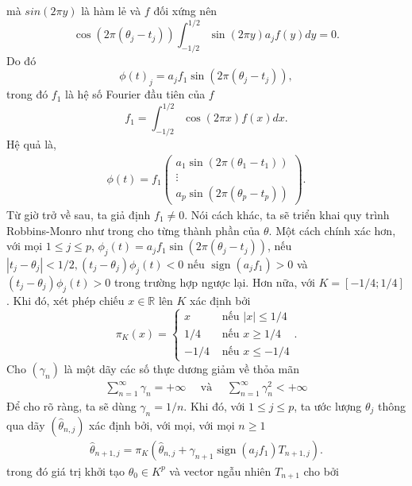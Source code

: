 mà $sin(2\pi y)$ là hàm lẻ và $f$ đối xứng nên
$$
\cos (2 \pi(\theta_j-t_{j})) \int_{-1 / 2}^{1 / 2} \sin (2 \pi y) a_{j}f(y) d y = 0.
$$
Do đó
$$
\phi(t)_j =a_{j} f_{1} \sin \left(2 \pi\left(\theta_{j}-t_{j}\right)\right),
$$
trong đó $f_{1}$ là hệ số Fourier đầu tiên của $f$
$$
f_{1}=\int_{-1 / 2}^{1 / 2} \cos (2 \pi x) f(x) d x.
$$
Hệ quả là,
\begin{align}
    \phi(t)=f_{1}\left(\begin{array}{c}
a_{1} \sin \left(2 \pi\left(\theta_{1}-t_{1}\right)\right) \\
\vdots \\
a_{p} \sin \left(2 \pi\left(\theta_{p}-t_{p}\right)\right)
\end{array}\right).
\label{4.4}
\end{align}
Từ giờ trở về sau, ta giả định $f_{1} \neq 0$. Nói cách khác, ta sẽ triển khai quy trình Robbins-Monro như trong \cite{bercu} cho từng thành phần của  $\theta$. Một cách chính xác hơn, với mọi $1 \leq j \leq p$,  $\phi_{j}(t)=a_{j} f_{1} \sin \left(2 \pi\left(\theta_{j}-t_{j}\right)\right)$, nếu $\left|t_{j}-\theta_{j}\right|<1 / 2,\left(t_{j}-\theta_{j}\right) \phi_{j}(t)<0$ nếu $\operatorname{sign}\left(a_{j} f_{1}\right)>0$ và $\left(t_{j}-\theta_{j}\right) \phi_{j}(t)>0$ trong trường hợp ngược lại. Hơn nữa, với $K=[-1 / 4 ; 1 / 4]$. Khi đó, xét phép chiếu $x \in \mathbb{R}$ lên $K$ xác định bởi
$$
\pi_{K}(x)=\left\{\begin{array}{cl}
x & \text { nếu }|x| \leq 1 / 4 \\
1 / 4 & \text { nếu } x \geq 1 / 4 \\
-1 / 4 & \text { nếu } x \leq-1 / 4
\end{array}\right..
$$
Cho $\left(\gamma_{n}\right)$ là một dãy các số thực dương giảm về thỏa mãn
\begin{align}
    \sum_{n=1}^{\infty} \gamma_{n}=+\infty \quad \text { và } \quad \sum_{n=1}^{\infty} \gamma_{n}^{2}<+\infty
    \label{4.5}
\end{align}
Để cho rõ ràng, ta sẽ dùng $\gamma_{n}=1 / n$. Khi đó, với $1 \leq j \leq p$, ta ước lượng $\theta_{j}$ thông qua dãy $\left(\widehat{\theta}_{n, j}\right)$ xác định bởi, với mọi, với mọi $n \geq 1$
\begin{align}
    \widehat{\theta}_{n+1, j}=\pi_{K}\left(\widehat{\theta}_{n, j}+\gamma_{n+1} \operatorname{sign}\left(a_{j} f_{1}\right) T_{n+1, j}\right).
    \label{4.6}
\end{align}
trong đó giá trị khởi tạo $\widehat{\theta}_{0} \in K^{p}$ và vector ngẫu nhiên $T_{n+1}$ cho bởi
